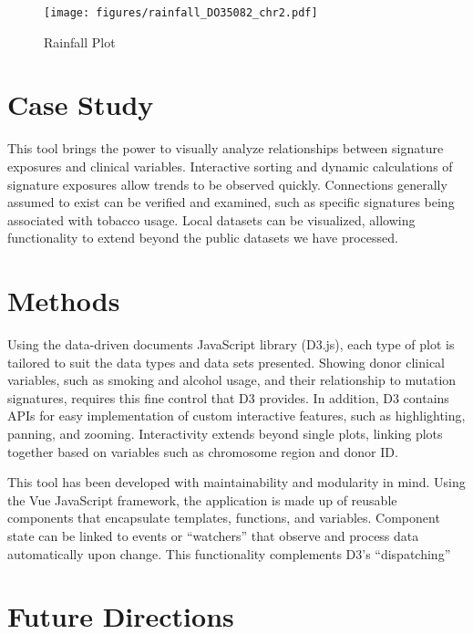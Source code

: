 \documentclass[12pt, letterpaper]{article}
\begin{document}
\begin{enumerate}
    \begin{figure}
        \caption{Rainfall Plot}
        \centering
        \texttt{[image: figures/rainfall\_DO35082\_chr2.pdf]}
    \end{figure}
\end{enumerate}







\section{Case Study}
This tool brings the power to visually analyze relationships between signature exposures and clinical variables.
Interactive sorting and dynamic calculations of signature exposures allow trends to be observed quickly.
Connections generally assumed to exist can be verified and examined, such as specific signatures being associated with tobacco usage.
Local datasets can be visualized, allowing functionality to extend beyond the public datasets we have processed.

\section{Methods}
Using the data-driven documents JavaScript library (D3.js)\cite{bostock2011d3}, each type of plot is tailored to suit the data types and data sets presented.
Showing donor clinical variables, such as smoking and alcohol usage, and their relationship to mutation signatures, requires this fine control that D3 provides.
In addition, D3 contains APIs for easy implementation of custom interactive features, such as highlighting, panning, and zooming.
Interactivity extends beyond single plots, linking plots together based on variables such as chromosome region and donor ID.   

This tool has been developed with maintainability and modularity in mind.
Using the Vue JavaScript framework, the application is made up of reusable components that encapsulate templates, functions, and variables.
Component state can be linked to events or ``watchers'' that observe and process data automatically upon change.
This functionality complements D3's ``dispatching''

\section{Future Directions}


{}

\end{document}
